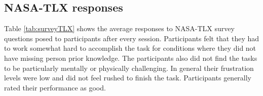 \documentclass{article}
\begin{document}
	\subsection{NASA-TLX responses}
	\begin{table}[H]
		\centering
		\caption{NASA-TLX responses on a 0--20 scale across different conditions}
		\label{tab:surveyTLX}%
	\end{table}%
	Table \ref{tab:surveyTLX} shows the average responses to NASA-TLX survey questions posed to participants after every session. Participants felt that they had to work somewhat hard to accomplish the task for conditions where they did not have missing person prior knowledge. The participants also did not find the tasks to be particularly mentally or physically challenging. In general their frustration levels were low and did not feel rushed to finish the task. Participants generally rated their performance as good.
	
\end{document}
